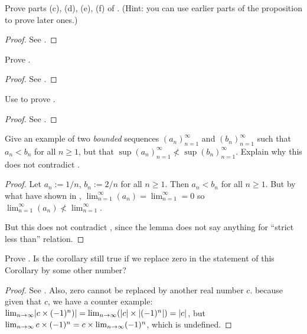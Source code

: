 \begin{exercise} \label{exercise 6.4.3}
Prove parts (c), (d), (e), (f) of .
(Hint: you can use earlier parts of the proposition to prove later ones.)
\end{exercise}

\begin{proof}
See .
\end{proof}

\begin{exercise} \label{exercise 6.4.4}
Prove .
\end{exercise}

\begin{proof}
See .
\end{proof}

\begin{exercise} \label{exercise 6.4.5}
Use  to prove .
\end{exercise}

\begin{proof}
See .
\end{proof}

\begin{exercise} \label{exercise 6.4.6}
Give an example of two \emph{bounded} sequences \((a_n)_{n = 1}^{\infty}\) and \((b_n)_{n = 1}^{\infty}\) such that \(a_n < b_n\) for all \(n \ge 1\),
but that \(\sup(a_n)_{n = 1}^{\infty} \not < \sup(b_n)_{n = 1}^{\infty}\).
Explain why this does not contradict .
\end{exercise}

\begin{proof}
Let \(a_n := 1/n\), \(b_n := 2/n\) for all \(n \ge 1\).
Then \(a_n < b_n\) for all \(n \ge 1\).
But by what have shown in , \(\lim_{n = 1}^{\infty} (a_n) = \lim_{n = 1}^{\infty} = 0\) so \(\lim_{n = 1}^{\infty} (a_n) \not < \lim_{n = 1}^{\infty}\).

But this does not contradict , since the lemma does not say anything for ``strict less than'' relation.
\end{proof}

\begin{exercise} \label{exercise 6.4.7}
Prove . Is the corollary still true if we replace zero in the statement of this Corollary by some other number?
\end{exercise}

\begin{proof}
See .
Also, zero cannot be replaced by another real number \(c\).
because given that \(c\), we have a counter example:
\(\lim_{n \to \infty} \lvert c \times (-1)^n)\rvert = \lim_{n \to \infty} (\lvert c\rvert \times \lvert(-1)^n\rvert) =  \lvert c\rvert\),
but \(\lim_{n \to \infty} c \times (-1)^n = c \times \lim_{n \to \infty} (-1)^n\), which is undefined.
\end{proof}

